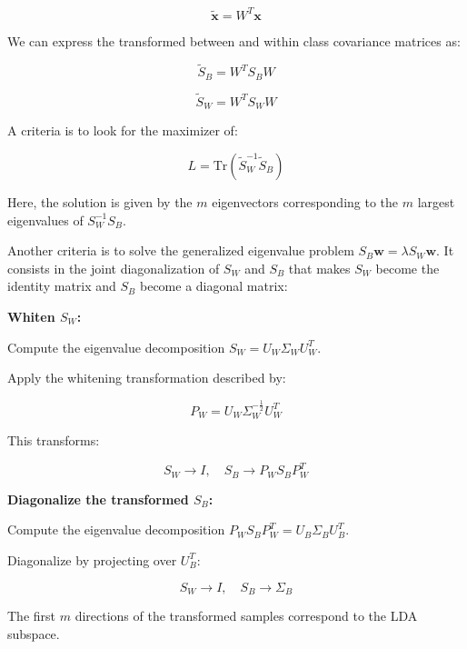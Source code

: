 \begin{equation*}
	\widetilde{\mathbf{x}} = W^T\mathbf{x}
\end{equation*}

We can express the transformed between and within class covariance matrices as:

\begin{equation*}
	\widetilde{S}_B = W^T S_B W
\end{equation*}

\begin{equation*}
	\widetilde{S}_W = W^T S_W W
\end{equation*}

A criteria is to look for the maximizer of:

\begin{equation*}
L = \text{Tr}\left(\tilde{S}_W^{-1}\tilde{S}_B\right)
\end{equation*}

Here, the solution is given by the $m$ eigenvectors corresponding to the $m$ largest eigenvalues of $S_W^{-1}S_B$.


\begin{tcolorbox}[title=Approfondimento: metodo alternativo]
Another criteria is to solve the generalized eigenvalue problem $S_B\mathbf{w} = \lambda S_W\mathbf{w}$. It consists in the joint diagonalization of $S_W$ and $S_B$ that makes $S_W$ become the identity matrix and $S_B$ become a diagonal matrix:

\textbf{Whiten $S_W$:}

Compute the eigenvalue decomposition $S_W = U_W \Sigma_W U_W^T$.

Apply the whitening transformation described by:

\begin{equation*}
P_W = U_W \Sigma_W^{-\frac{1}{2}} U_W^T
\end{equation*}

This transforms:

\begin{equation*}
S_W \rightarrow I, \quad S_B \rightarrow P_W S_B P_W^T
\end{equation*}

\textbf{Diagonalize the transformed $S_B$:}

Compute the eigenvalue decomposition $P_W S_B P_W^T = U_B \Sigma_B U_B^T$.

Diagonalize by projecting over $U_B^T$:

\begin{equation*}
S_W \rightarrow I, \quad S_B \rightarrow \Sigma_B
\end{equation*}

The first $m$ directions of the transformed samples correspond to the LDA subspace.
\end{tcolorbox}

